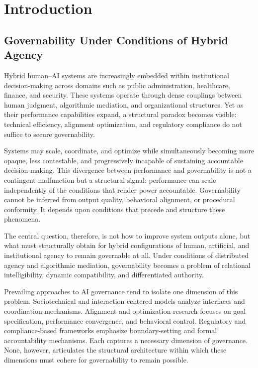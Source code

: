 \documentclass[12pt]{article}
\begin{document}
\section{Introduction}


\subsection*{Governability Under Conditions of Hybrid Agency}


Hybrid human–AI systems are increasingly embedded within institutional decision-making across domains such as public administration, healthcare, finance, and security. These systems operate through dense couplings between human judgment, algorithmic mediation, and organizational structures. Yet as their performance capabilities expand, a structural paradox becomes visible: technical efficiency, alignment optimization, and regulatory compliance do not suffice to secure governability.

Systems may scale, coordinate, and optimize while simultaneously becoming more opaque, less contestable, and progressively incapable of sustaining accountable decision-making. This divergence between performance and governability is not a contingent malfunction but a structural signal: performance can scale independently of the conditions that render power accountable. Governability cannot be inferred from output quality, behavioral alignment, or procedural conformity. It depends upon conditions that precede and structure these phenomena.

The central question, therefore, is not how to improve system outputs alone, but what must structurally obtain for hybrid configurations of human, artificial, and institutional agency to remain governable at all. Under conditions of distributed agency and algorithmic mediation, governability becomes a problem of relational intelligibility, dynamic compatibility, and differentiated authority.

Prevailing approaches to AI governance tend to isolate one dimension of this problem. Sociotechnical and interaction-centered models analyze interfaces and coordination mechanisms. Alignment and optimization research focuses on goal specification, performance convergence, and behavioral control. Regulatory and compliance-based frameworks emphasize boundary-setting and formal accountability mechanisms. Each captures a necessary dimension of governance. None, however, articulates the structural architecture within which these dimensions must cohere for governability to remain possible.
\end{document}

